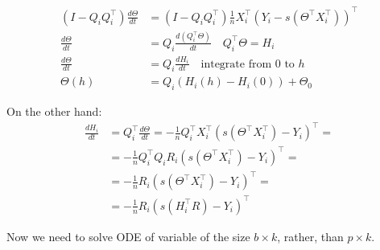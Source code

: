 \documentclass{article}
\begin{document}
\begin{align}
\nonumber (I - Q_iQ_i^\top)\frac{d \Theta}{d t} &= (I - Q_iQ_i^\top) \frac{1}{n} X_i^\top(Y_i -s(\Theta^\top X_i^\top))^\top \\
\nonumber \frac{d \Theta}{d t} &= Q_i\frac{d (Q_i^\top\Theta)}{d t} \quad Q_i^\top \Theta = H_i \\ 
\nonumber \frac{d \Theta}{d t} &= Q_i\frac{d H_i }{d t} \quad \text{integrate from $0$ to $h$}\\ 
\label{strang:softmax_theta_from_eta}\Theta(h) &= Q_i \left(H_i (h) - H_i (0) \right) + \Theta_0
\end{align}

On the other hand:
\begin{align}\nonumber
\frac{d H_i }{d t} &= Q_i^\top\frac{d \Theta}{d t} =  - \frac{1}{n} Q_i^\top  X_i^\top(s(\Theta^\top X_i^\top) - Y_i)^\top = \\ 
\nonumber&= - \frac{1}{n} Q_i^\top  Q_i R_i(s(\Theta^\top X_i^\top) - Y_i)^\top =\\
\nonumber&= - \frac{1}{n} R_i(s(\Theta^\top X_i^\top) - Y_i)^\top =\\
\nonumber&= - \frac{1}{n} R_i(s(H_i^\top R) - Y_i)^\top 
\end{align}

Now we need to solve ODE of variable of the size $b \times k$, rather, than $p \times k$.
\end{document}
